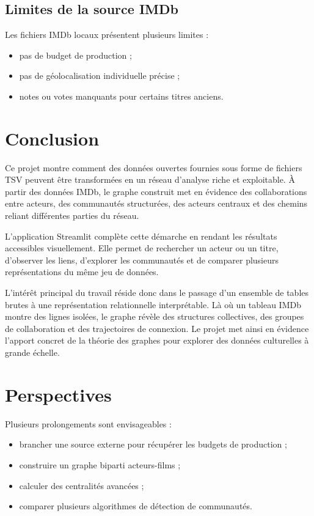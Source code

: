 \documentclass[a4paper,12pt]{article}
\begin{document}
\subsection{Limites de la source IMDb}

Les fichiers IMDb locaux présentent plusieurs limites :
\begin{itemize}[leftmargin=1.4cm, itemsep=2pt]
  \item pas de budget de production ;
  \item pas de géolocalisation individuelle précise ;
  \item notes ou votes manquants pour certains titres anciens.
\end{itemize}
\newpage
\section{Conclusion}

Ce projet montre comment des données ouvertes fournies sous forme de fichiers TSV peuvent être transformées en un réseau d'analyse riche et exploitable. À partir des données IMDb, le graphe construit met en évidence des collaborations entre acteurs, des communautés structurées, des acteurs centraux et des chemins reliant différentes parties du réseau.

L'application Streamlit complète cette démarche en rendant les résultats accessibles visuellement. Elle permet de rechercher un acteur ou un titre, d'observer les liens, d'explorer les communautés et de comparer plusieurs représentations du même jeu de données.

L'intérêt principal du travail réside donc dans le passage d'un ensemble de tables brutes à une représentation relationnelle interprétable. Là où un tableau IMDb montre des lignes isolées, le graphe révèle des structures collectives, des groupes de collaboration et des trajectoires de connexion. Le projet met ainsi en évidence l'apport concret de la théorie des graphes pour explorer des données culturelles à grande échelle.

\section{Perspectives}

Plusieurs prolongements sont envisageables :

\begin{itemize}[leftmargin=1.4cm, itemsep=4pt]
  \item brancher une source externe pour récupérer les budgets de production ;
  \item construire un graphe biparti acteurs-films ;
  \item calculer des centralités avancées ;
  \item comparer plusieurs algorithmes de détection de communautés.
\end{itemize}
\end{document}
